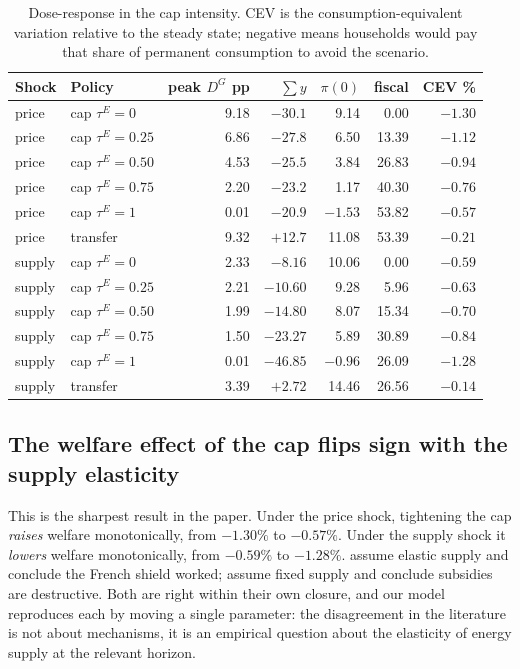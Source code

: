 \documentclass[11pt,a4paper]{article}
\begin{document}
\begin{table}[h]\centering\small
\begin{tabular}{llrrrrr}
\toprule
Shock & Policy & peak $D^{G}$ pp & $\sum y$ & $\pi(0)$ & fiscal & CEV \%\\
\midrule
price & cap $\tau^E=0$    & 9.18 & $-30.1$ & 9.14 & 0.00 & $-1.30$\\
price & cap $\tau^E=0.25$ & 6.86 & $-27.8$ & 6.50 & 13.39 & $-1.12$\\
price & cap $\tau^E=0.50$ & 4.53 & $-25.5$ & 3.84 & 26.83 & $-0.94$\\
price & cap $\tau^E=0.75$ & 2.20 & $-23.2$ & 1.17 & 40.30 & $-0.76$\\
price & cap $\tau^E=1$    & 0.01 & $-20.9$ & $-1.53$ & 53.82 & $-0.57$\\
price & transfer          & 9.32 & $+12.7$ & 11.08 & 53.39 & $-0.21$\\
\midrule
supply & cap $\tau^E=0$    & 2.33 & $-8.16$ & 10.06 & 0.00 & $-0.59$\\
supply & cap $\tau^E=0.25$ & 2.21 & $-10.60$ & 9.28 & 5.96 & $-0.63$\\
supply & cap $\tau^E=0.50$ & 1.99 & $-14.80$ & 8.07 & 15.34 & $-0.70$\\
supply & cap $\tau^E=0.75$ & 1.50 & $-23.27$ & 5.89 & 30.89 & $-0.84$\\
supply & cap $\tau^E=1$    & 0.01 & $-46.85$ & $-0.96$ & 26.09 & $-1.28$\\
supply & transfer          & 3.39 & $+2.72$  & 14.46 & 26.56 & $-0.14$\\
\bottomrule
\end{tabular}
\caption{Dose-response in the cap intensity. CEV is the consumption-equivalent
variation relative to the steady state; negative means households would pay
that share of permanent consumption to avoid the scenario.}
\label{tab:dose}
\end{table}

\subsection{The welfare effect of the cap flips sign with the supply elasticity}

This is the sharpest result in the paper. Under the price shock, tightening
the cap \emph{raises} welfare monotonically, from $-1.30\%$ to $-0.57\%$.
Under the supply shock it \emph{lowers} welfare monotonically, from $-0.59\%$
to $-1.28\%$. \citet{Langot2026} assume elastic supply and conclude the French
shield worked; \citet{Bayer2026} assume fixed supply and conclude subsidies
are destructive. Both are right within their own closure, and our model
reproduces each by moving a single parameter: the disagreement in the
literature is not about mechanisms, it is an empirical question about the
elasticity of energy supply at the relevant horizon.
\end{document}

